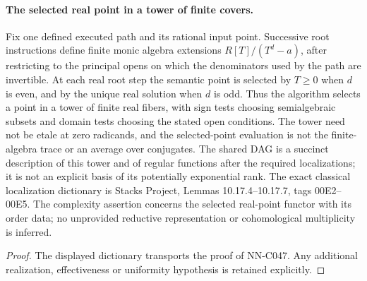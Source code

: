\begin{geometricstatement}[NN-C047]
\paragraph{The selected real point in a tower of finite covers.}
Fix one defined executed path and its rational input point.  Successive
root instructions define finite monic algebra extensions
$R[T]/(T^d-a)$, after restricting to the principal opens on which
the denominators used by the path are invertible.  At each real root
step the semantic point is selected by $T\geq0$ when $d$ is even,
and by the unique real solution when $d$ is odd.  Thus the algorithm
selects a point in a tower of finite real fibers, with sign tests
choosing semialgebraic subsets and domain tests choosing the stated
open conditions.  The tower need not be etale at zero radicands,
and the selected-point evaluation is not the finite-algebra trace or
an average over conjugates.  The shared DAG is a succinct description
of this tower and of regular functions after the required
localizations; it is not an explicit basis of its potentially
exponential rank.  The exact classical localization dictionary is
Stacks Project, Lemmas 10.17.4--10.17.7, tags 00E2--00E5.  The
complexity assertion concerns the selected real-point functor with
its order data; no unprovided reductive representation or
cohomological multiplicity is inferred.
\end{geometricstatement}
\begin{proof} The displayed dictionary transports the proof of NN-C047. Any additional realization, effectiveness or uniformity hypothesis is retained explicitly.\end{proof}


